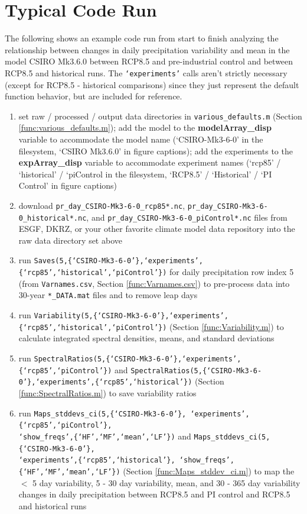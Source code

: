 \documentclass{article}
\begin{document}
\section{Typical Code Run} %
The following shows an example code run from start to finish analyzing the relationship between changes in daily precipitation variability and mean in the model CSIRO Mk3.6.0 between RCP8.5 and pre-industrial control and between RCP8.5 and historical runs. The \texttt{`experiments'} calls aren't strictly necessary (except for RCP8.5 - historical comparisons) since they just represent the default function behavior, but are included for reference.
\begin{enumerate}
\item set raw / processed / output data directories in \texttt{various\_defaults.m} (Section \ref{func:various_defaults.m}); add the model to the \textbf{modelArray\_disp} variable to accommodate the model name (`CSIRO-Mk3-6-0' in the filesystem, `CSIRO Mk3.6.0' in figure captions); add the experiments to the \textbf{expArray\_disp} variable to accommodate experiment names (`rcp85' / `historical' / `piControl in the filesystem, `RCP8.5' / `Historical' / `PI Control' in figure captions)
\item download \texttt{pr\_day\_CSIRO-Mk3-6-0\_rcp85*.nc}, \texttt{pr\_day\_CSIRO-Mk3-6-0\_historical*.nc}, and \texttt{pr\_day\_CSIRO-Mk3-6-0\_piControl*.nc} files from ESGF, DKRZ, or your other favorite climate model data repository into the raw data directory set above
\item run \texttt{Saves(5,\{`CSIRO-Mk3-6-0'\},`experiments',\{`rcp85',`historical',`piControl'\})} for daily precipitation row index 5 (from \texttt{Varnames.csv}, Section \ref{func:Varnames.csv}) to pre-process data into 30-year \texttt{*\_DATA.mat} files and to remove leap days
\item run \texttt{Variability(5,\{`CSIRO-Mk3-6-0'\},`experiments',\{`rcp85',`historical',`piControl'\})} (Section \ref{func:Variability.m}) to calculate integrated spectral densities, means, and standard deviations
\item run \texttt{SpectralRatios(5,\{`CSIRO-Mk3-6-0'\},`experiments',\{`rcp85',`piControl'\})} and \texttt{SpectralRatios(5,\{`CSIRO-Mk3-6-0'\},`experiments',\{`rcp85',`historical'\})} (Section \ref{func:SpectralRatios.m}) to save variability ratios
\item run \texttt{Maps\_stddevs\_ci(5,\{`CSIRO-Mk3-6-0'\}, `experiments',\{`rcp85',`piControl'\},}\\ \texttt{`show\_freqs',\{`HF',`MF',`mean',`LF'\})} and \texttt{Maps\_stddevs\_ci(5,\{`CSIRO-Mk3-6-0'\}, \\`experiments',\{`rcp85',`historical'\}, `show\_freqs',\{`HF',`MF',`mean',`LF'\})} (Section \ref{func:Maps_stddev_ci.m}) to map the $<$ 5 day variability, 5 - 30 day variability, mean, and 30 - 365 day variability changes in daily precipitation between RCP8.5 and PI control and RCP8.5 and historical runs

\end{enumerate}
\end{document}
